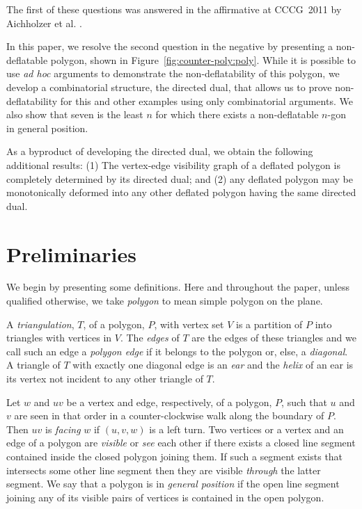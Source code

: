 \documentclass[11pt]{amsart}
\begin{document}
The first of these questions was answered in the affirmative at CCCG~2011 by Aichholzer et al. \cite{Aichholzer11b}.

In this paper, we resolve the second question in the negative by
presenting a non-deflatable polygon, shown in
Figure~\ref{fig:counter-poly:poly}.  While it is possible to use
\textit{ad hoc} arguments to demonstrate the non-deflatability of this
polygon, we develop a combinatorial structure, the directed dual, that
allows us to prove non-deflatability for this and other examples using
only combinatorial arguments.  We also show that seven is the least
$n$ for which there exists a non-deflatable $n$-gon in general
position.

As a byproduct of developing the directed dual, we obtain the
following additional results: (1) The vertex-edge visibility graph of
a deflated polygon is completely determined by its directed dual; and
(2) any deflated polygon may be monotonically deformed into any other
deflated polygon having the same directed dual.



\section{Preliminaries}

We begin by presenting some definitions.  Here and throughout the
paper, unless qualified otherwise, we take \emph{polygon} to mean
simple polygon on the plane.

A \emph{triangulation}, $T$, of a polygon, $P$, with vertex set $V$ is
a partition of $P$ into triangles with vertices in $V$.  The
\emph{edges} of $T$ are the edges of these triangles and we call such
an edge a \emph{polygon edge} if it belongs to the polygon or, else, a
\emph{diagonal}.  A triangle of $T$ with exactly one diagonal edge is
an \emph{ear} and the \emph{helix} of an ear is its vertex not
incident to any other triangle of $T$.


Let $w$ and $uv$ be a vertex and edge, respectively, of a polygon,
$P$, such that $u$ and $v$ are seen in that order in a
counter-clockwise walk along the boundary of $P$.  Then $uv$
is \emph{facing} $w$ if $(u,v,w)$ is a left turn.  Two vertices or a
vertex and an edge of a polygon are \emph{visible} or \emph{see} each
other if there exists a closed line segment contained inside the
closed polygon joining them.  If such a segment exists that intersects
some other line segment then they are visible \emph{through} the
latter segment.  We say that a polygon is in \emph{general position}
if the open line segment joining any of its visible pairs of vertices
is contained in the open polygon.
\end{document}
